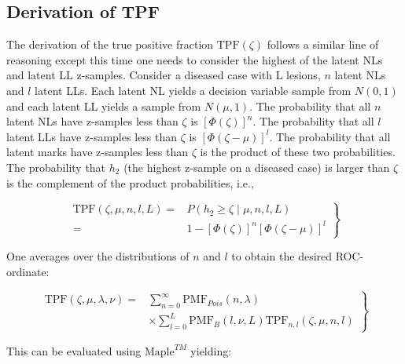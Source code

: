 \documentclass[
]{book}
\begin{document}
\hypertarget{rsm-predictions-roc-curve-tpf}{%
\subsection{Derivation of TPF}\label{rsm-predictions-roc-curve-tpf}}

The derivation of the true positive fraction \(\text{TPF}(\zeta)\) follows a similar line of reasoning except this time one needs to consider the highest of the latent NLs and latent LL z-samples. Consider a diseased case with L lesions, \(n\) latent NLs and \(l\) latent LLs. Each latent NL yields a decision variable sample from \(N(0,1)\) and each latent LL yields a sample from \(N(\mu,1)\). The probability that all \(n\) latent NLs have z-samples less than \(\zeta\) is \([\Phi(\zeta)]^n\). The probability that all \(l\) latent LLs have z-samples less than \(\zeta\) is \([\Phi(\zeta - \mu)]^l\). The probability that all latent marks have z-samples less than \(\zeta\) is the product of these two probabilities. The probability that \(h_2\) (the highest z-sample on a diseased case) is larger than \(\zeta\) is the complement of the product probabilities, i.e.,

\begin{equation}
\left. 
\begin{aligned}
\text{TPF}\left ( \zeta, \mu, n, l, L \right ) =& 
P\left ( h_2 \geq \zeta \mid \mu, n, l, L \right ) \\
=& 1 - \left [ \Phi\left ( \zeta \right ) \right ]^n \left [ \Phi\left ( \zeta - \mu\right ) \right ]^l
\end{aligned}
\right \}
\label{eq:rsm-predictions-tpf-vary-nl}
\end{equation}

One averages over the distributions of \(n\) and \(l\) to obtain the desired ROC-ordinate:

\begin{equation}
\left.
\begin{aligned}
\text{TPF}\left ( \zeta, \mu, \lambda, \nu \right ) =& \sum_{n=0}^{\infty} \text{PMF}_{Pois}(n,\lambda) \\
&\times \sum_{l=0}^{L} \text{PMF}_{B}(l,\nu,L) \text{TPF}_{n,l}\left ( \zeta, \mu, n, l \right )
\end{aligned}
\right \}
\label{eq:rsm-predictions-tpf-double-summation}
\end{equation}

This can be evaluated using \(\text{Maple}^{TM}\) yielding:
\end{document}

